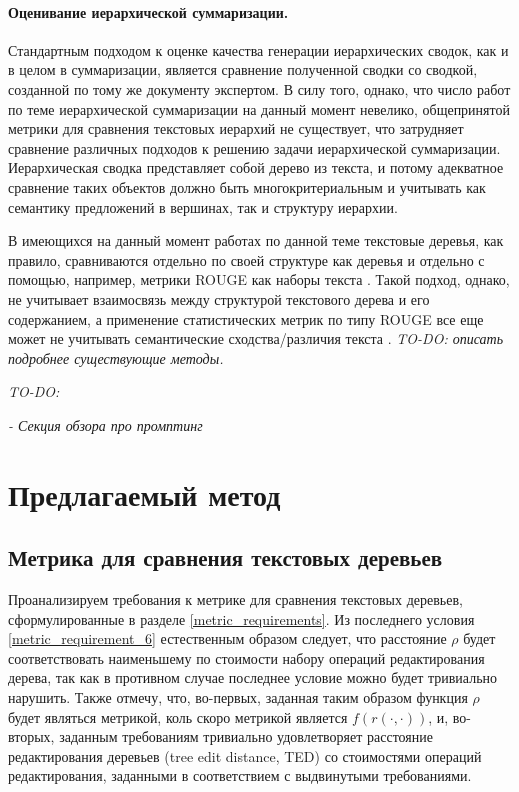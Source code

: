 \documentclass[12pt]{article}
\begin{document}
\paragraph{Оценивание иерархической суммаризации.} Стандартным подходом к оценке качества генерации иерархических сводок, как и в целом в суммаризации, является сравнение полученной сводки со сводкой, созданной по тому же документу экспертом. В силу того, однако, что число работ по теме иерархической суммаризации на данный момент невелико, общепринятой метрики для сравнения текстовых иерархий не существует, что затрудняет сравнение различных подходов к решению задачи иерархической суммаризации. Иерархическая сводка представляет собой дерево из текста, и потому адекватное сравнение таких объектов должно быть многокритериальным и учитывать как семантику предложений в вершинах, так и структуру иерархии. 

В имеющихся на данный момент работах по данной теме текстовые деревья, как правило, сравниваются отдельно по своей структуре как деревья и отдельно с помощью, например, метрики ROUGE \cite{lin2004rouge} как наборы текста \cite{wei2019revealing, zhang2024coreference}. Такой подход, однако, не учитывает взаимосвязь между структурой текстового дерева и его содержанием, а применение статистических метрик по типу ROUGE все еще может не учитывать семантические сходства/различия текста \cite{fabbri2021summeval}. \textit{TO-DO: описать подробнее существующие методы.} 

\textit{TO-DO:}

\textit{- Секция обзора про промптинг}

\newpage
\section{Предлагаемый метод}

\subsection{Метрика для сравнения текстовых деревьев}

Проанализируем требования к метрике для сравнения текстовых деревьев, сформулированные в разделе \ref{metric_requirements}. Из последнего условия \eqref{metric_requirement_6} естественным образом следует, что расстояние $\rho$ будет соответствовать наименьшему по стоимости набору операций редактирования дерева, так как в противном случае последнее условие можно будет тривиально нарушить. Также отмечу, что, во-первых, заданная таким образом функция $\rho$ будет являться метрикой, коль скоро метрикой является $f\left(r(\cdot, \cdot)\right)$, и, во-вторых, заданным требованиям тривиально удовлетворяет расстояние редактирования деревьев (tree edit distance, TED) со стоимостями операций редактирования, заданными в соответствием с выдвинутыми требованиями.
\end{document}
